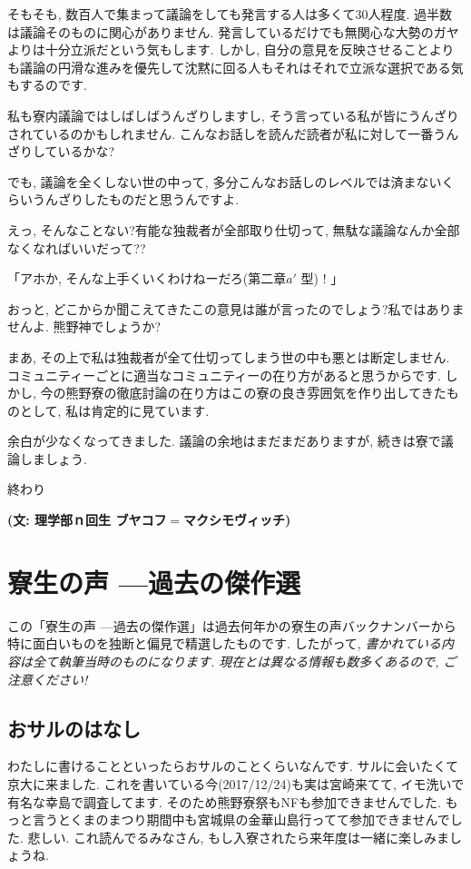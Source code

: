 \documentclass[10pt,b5jsbook,dvips,dvipdfmx,openany]{jsbook}
\theoremstyle{definition}
\begin{document}
		そもそも, 数百人で集まって議論をしても発言する人は多くて30人程度. 過半数は議論そのものに関心がありません. 発言しているだけでも無関心な大勢のガヤよりは十分立派だという気もします. しかし, 自分の意見を反映させることよりも議論の円滑な進みを優先して沈黙に回る人もそれはそれで立派な選択である気もするのです.

		私も寮内議論ではしばしばうんざりしますし, そう言っている私が皆にうんざりされているのかもしれません. こんなお話しを読んだ読者が私に対して一番うんざりしているかな?

		でも, 議論を全くしない世の中って, 多分こんなお話しのレベルでは済まないくらいうんざりしたものだと思うんですよ.

		えっ, そんなことない?有能な独裁者が全部取り仕切って, 無駄な議論なんか全部なくなればいいだって??

		「アホか, そんな上手くいくわけねーだろ(第二章$a'$ 型) ! 」

		おっと, どこからか聞こえてきたこの意見は誰が言ったのでしょう?私ではありませんよ. 熊野神でしょうか?

		まあ, その上で私は独裁者が全て仕切ってしまう世の中も悪とは断定しません. コミュニティーごとに適当なコミュニティーの在り方があると思うからです. しかし, 今の熊野寮の徹底討論の在り方はこの寮の良き雰囲気を作り出してきたものとして, 私は肯定的に見ています.

		余白が少なくなってきました. 議論の余地はまだまだありますが, 続きは寮で議論しましょう.

		終わり

		{\bf (文: 理学部ｎ回生 ブヤコフ$=$マクシモヴィッチ)}



\chapter{寮生の声 ---過去の傑作選}

\setcounter{footnote}{0}

この「寮生の声 ---過去の傑作選」は過去何年かの寮生の声バックナンバーから特に面白いものを独断と偏見で精選したものです. したがって, \emph{書かれている内容は全て執筆当時のものになります. 現在とは異なる情報も数多くあるので, ご注意ください!}

		\section{おサルのはなし}
		わたしに書けることといったらおサルのことくらいなんです. サルに会いたくて京大に来ました. これを書いている今(2017/12/24)も実は宮崎来てて, イモ洗いで有名な幸島で調査してます. そのため熊野寮祭もNFも参加できませんでした. もっと言うとくまのまつり期間中も宮城県の金華山島行ってて参加できませんでした. 悲しい. これ読んでるみなさん, もし入寮されたら来年度は一緒に楽しみましょうね.
\end{document}
